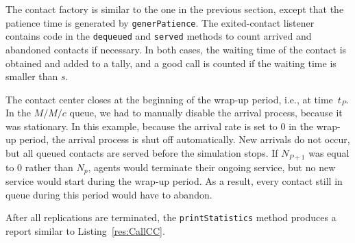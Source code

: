 The contact factory is similar to the one in the previous section,
except that
the patience time is generated by \texttt{gener\-Patience}.  The
exited-contact listener contains code in the \texttt{dequeued} and
\texttt{served} methods to count arrived and abandoned contacts if
necessary.  In both cases, the waiting time of the contact is obtained
and added to a tally, and a good call is counted if the waiting time
is smaller than $s$.

The contact center closes at the beginning of the wrap-up period,
i.e., at time~$t_P$.  In
the $M/M/c$ queue, we had to manually disable the 
arrival process, because it was stationary.
In this example, because the arrival rate is set to 0 in the wrap-up
period, the arrival process is shut off automatically.  New arrivals
do not occur, but
all queued contacts are served before the simulation stops.
If $N_{P+1}$ was equal to 0 rather than $N_p$, agents would terminate
their ongoing service, but no new service would start during the
wrap-up period.  As a result, every contact still in queue during this
period would have to abandon.

After all replications are terminated,
the \texttt{print\-Statistics} method produces a report similar to
Listing~\ref{res:CallCC}. 


